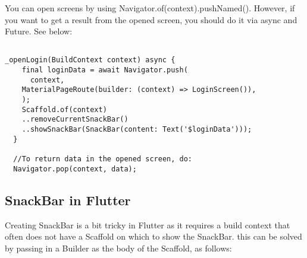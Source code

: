 \documentclass{article}
\begin{document}
You can open screens by using Navigator.of(context).pushNamed(). However, if you want to get a result from the opened screen, you should do it via async and Future. See below:

\begin{lstlisting}

_openLogin(BuildContext context) async {
    final loginData = await Navigator.push(
      context,
    MaterialPageRoute(builder: (context) => LoginScreen()),
    );
    Scaffold.of(context)
    ..removeCurrentSnackBar()
    ..showSnackBar(SnackBar(content: Text('$loginData')));
  }
  
  //To return data in the opened screen, do: 
  Navigator.pop(context, data);

\end{lstlisting} 

\subsection{SnackBar in Flutter}
Creating SnackBar is a bit tricky in Flutter as it requires a build context that often does not have a Scaffold on which to show the SnackBar. this can be solved by passing in a Builder as the body of the Scaffold, as follows:  

\begin{lstlisting}

\end{lstlisting}
\end{document}
